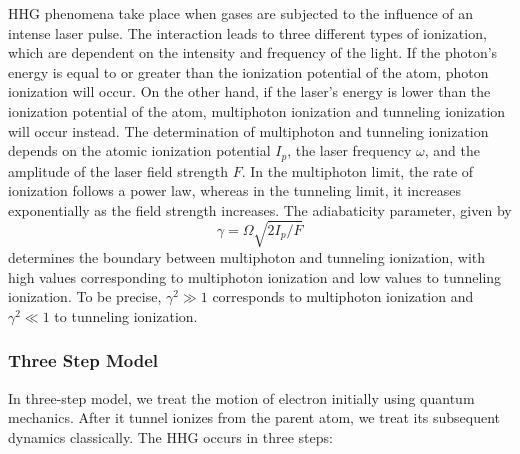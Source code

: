 HHG phenomena take place when gases are subjected to the influence of an intense laser pulse. The interaction leads to three different types of ionization, which are dependent on the intensity and frequency of the light. If the photon's energy is equal to or greater than the ionization potential of the atom, photon ionization will occur. On the other hand, if the laser's energy is lower than the ionization potential of the atom, multiphoton ionization and tunneling ionization will occur instead. The determination of multiphoton and tunneling ionization depends on the atomic ionization potential $I_p$, the laser frequency $\omega$, and the amplitude of the laser field strength $F$. In the multiphoton limit, the rate of ionization follows a power law, whereas in the tunneling limit, it increases exponentially as the field strength increases. The adiabaticity parameter, given by
\begin{equation}
    \label{eq:adiabatic}
    \gamma =\Omega \sqrt{2I_p/F}
\end{equation}
determines the boundary between multiphoton and tunneling ionization, with high values corresponding to multiphoton ionization and low values to tunneling ionization. To be precise, $\gamma^2 \gg 1$ corresponds to multiphoton ionization and $\gamma^2 \ll 1$ to tunneling ionization.\cite{gas-second}

\subsubsection{Three Step Model}

In three-step model, we treat the motion of electron initially using quantum mechanics. After it tunnel ionizes from the parent atom, we treat its subsequent dynamics classically. The HHG occurs in three steps:

